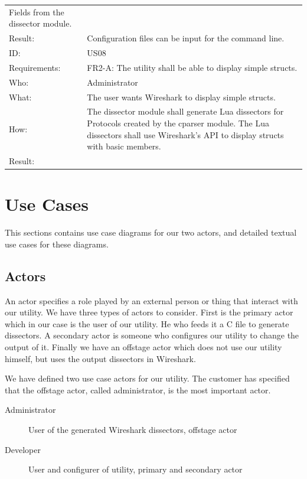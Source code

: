 \begin{table}[htbp]
{\begin{tabularx}{1.2\textwidth}{l X}
				  Fields from the dissector module. \\
	Result:		&  Configuration files can be input for the command line.\\
	\midrule
	ID:			& US08 \\
	Requirements:	&  FR2-A: The utility shall be able to display simple structs. \\
	Who:			& Administrator\\
	What:		& The user wants Wireshark to display simple structs. \\
	How:			& The dissector module shall generate Lua dissectors for Protocols created by the cparser module. 
				The Lua dissectors shall use Wireshark's API to display structs with basic members. \\
	Result:		&  \\

	\bottomrule
\end{tabularx}}
\end{table}


\section{Use Cases}
\label{sec:req:usecases}
This sections contains use case diagrams for our two actors, and detailed
textual use cases for these diagrams.

\subsection{Actors}
An actor specifies a role played by an external person or thing that interact
with our utility. We have three types of actors to consider. First is the
primary actor which in our case is the user of our utility. He who feeds it a
C file to generate dissectors. A secondary actor is someone who configures our
utility to change the output of it. Finally we have an offstage actor which
does not use our utility himself, but uses the output dissectors in Wireshark.

We have defined two use case actors for our utility. The customer has specified
that the offstage actor, called administrator, is the most important actor.
\begin{description}
	\item[Administrator] User of the generated Wireshark dissectors, offstage actor
	\item[Developer] User and configurer of utility, primary and secondary actor
\end{description}

